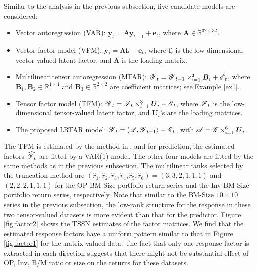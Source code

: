 \documentclass[12pt]{article}
\newcommand{\bm}{\boldsymbol}
\newcommand{\cm}[1]{\mbox{\boldmath$\mathscr{#1}$}}
\begin{document}
Similar to the analysis in the previous subsection, five candidate models are considered:
\begin{itemize}
	\item Vector autoregression (VAR): $\bm{y}_t=\bm{A}\bm{y}_{t-1}+\bm{e}_t$, where $\bm{A}\in\mathbb{R}^{32\times 32}$.
	
	\item Vector factor model (VFM): $\bm{y}_t=\bm{\Lambda}\bm{f}_{t}+\bm{e}_t$,
	where  $\bm{f}_{t}$ is the low-dimensional vector-valued latent factor, and $\bm{\Lambda}$ is the loading matrix. 
	
	\item Multilinear tensor autoregression (MTAR): $\cm{Y}_t=\cm{Y}_{t-1}\times_{i=1}^3\bm{B}_i+\cm{E}_t$, where $\bm{B}_1, \bm{B}_2 \in\mathbb{R}^{4\times 4}$ and $\bm{B}_3 \in\mathbb{R}^{2\times 2}$ are coefficient matrices; see Example \ref{ex1}. 
	
	\item Tensor factor model (TFM):  $\cm{Y}_t=\cm{F}_t\times_{i=1}^3\bm{U}_i+\cm{E}_t$, where   $\cm{F}_t$ is the low-dimensional tensor-valued latent factor, and $\bm{U}_i$'s are the loading matrices. 
	
	\item The proposed LRTAR model: $\cm{Y}_t=\langle\cm{A},\cm{Y}_{t-1}\rangle+\cm{E}_t$, with $\cm{A}=\cm{G}\times_{i=1}^{6}\bm{U}_i$.
\end{itemize}

The TFM is estimated by the method in \cite{chen2019factor}, and for prediction, the estimated factors $\cm{\widehat{F}}_{t}$ are fitted by a VAR(1) model. The other four models are fitted by the same methods as in the previous subsection.  
The multilinear ranks selected by the truncation method are $(\widehat{r}_1,\widehat{r}_2,\widehat{r}_3,\widehat{r}_4, \widehat{r}_5,\widehat{r}_6)=(3,3,2,1,1,1)$ and $(2,2,2,1,1,1)$ for the OP-BM-Size portfolio return series and the Inv-BM-Size portfolio return series, respectively. Note that similar to the BM-Size $10\times 10$ series in the previous subsection, the low-rank structure for the response in these two tensor-valued datasets is more evident than that for the predictor.  Figure \ref{fig:factor2} shows the TSSN estimates of the factor matrices. We find that the estimated response factors have a uniform pattern similar to that in Figure \ref{fig:factor1} for the matrix-valued data.  The fact that only one response factor is extracted in each direction suggests that there might not be substantial effect of OP, Inv, B/M ratio or size on the returns for these datasets. 
\end{document}
